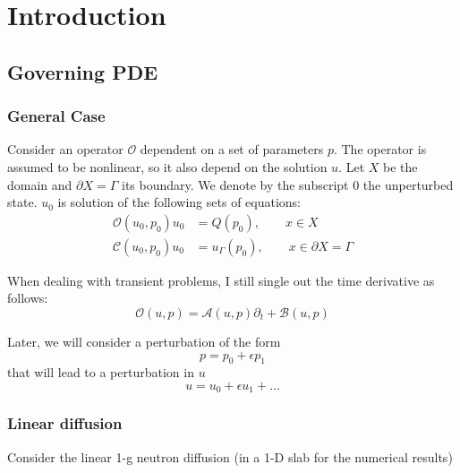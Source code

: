 \documentclass[11pt]{article}
\newcommand{\be}{\begin{equation}}
\newcommand{\ee}{\end{equation}}
\renewcommand{\O}{\mathcal{O}}
\newcommand{\mc}[1]{\mathcal{#1}}
\begin{document}
\newpage
\section{Introduction}

\subsection{Governing PDE}

\subsubsection{General Case}

Consider an operator $\O$ dependent on a set of parameters $p$. The operator is assumed
to be nonlinear, so it also depend on the solution $u$. Let $X$ be the domain and $\partial X=\Gamma$
its boundary. We denote by the subscript $0$ the unperturbed state. $u_0$ is solution of the following
sets of equations:
\begin{align}
\O(u_0,p_0) u_0 &= Q(p_0), \qquad x\in X \label{eq:gov} \\
\mc{C}(u_0,p_0) u_0 &=u_\Gamma(p_0), \qquad x \in \partial X=\Gamma \label{eq:BCgov}
\end{align}

When dealing with transient problems, I still single out the time derivative as follows:
\be
\O(u,p) = \mc{A}(u,p)\partial_t + \mc{B}(u,p)
\ee

Later, we will consider a perturbation of the form
\be
p = p_0 + \epsilon p_1
\ee
that will lead to a perturbation in $u$
\be
u=u_0 + \epsilon u_1 + \ldots
\ee

\subsubsection{Linear diffusion}

Consider the linear 1-g neutron diffusion (in a 1-D slab for the numerical results)
\end{document}
